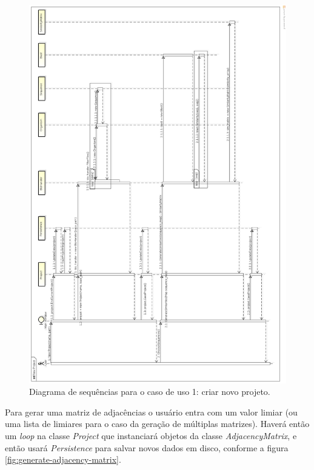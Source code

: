 \begin{figure}
\centering
\includegraphics[scale=0.27]{new-project}
\caption{Diagrama de sequências para o caso de uso 1: criar novo projeto.}
\label{fig:new-project}
\end{figure}

Para gerar uma matriz de adjacências o usuário entra com um valor limiar (ou uma lista de limiares para o caso da geração de múltiplas matrizes). Haverá
então um \textit{loop} na classe \textit{Project} que instanciará objetos da classe \textit{AdjacencyMatrix}, e então usará \textit{Persistence} para salvar
novos dados em disco, conforme a figura \ref{fig:generate-adjacency-matrix}. \newline

